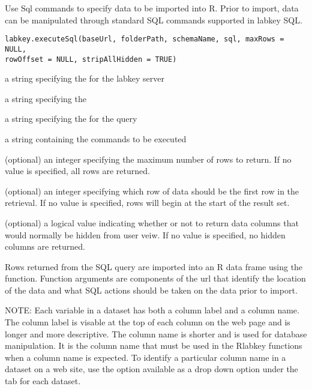 \begin{Description}\relax
Use Sql commands to specify data to be imported into R. Prior to import, data can
be manipulated through standard SQL commands supported in labkey SQL.
\end{Description}
\begin{Usage}
\begin{verbatim}
labkey.executeSql(baseUrl, folderPath, schemaName, sql, maxRows = NULL, 
rowOffset = NULL, stripAllHidden = TRUE)
\end{verbatim}
\end{Usage}
\begin{Arguments}
\begin{ldescription}
\item[\code{baseUrl}] a string specifying the for the labkey server
\item[\code{folderPath}] a string specifying the  
\item[\code{schemaName}] a string specifying the   for the query
\item[\code{sql}] a string containing the  commands to be executed
\item[\code{maxRows}] (optional) an integer specifying the maximum number of rows to return. If no value is specified, all rows are returned.
\item[\code{rowOffset}] (optional) an integer specifying which row of data should be the first row in the retrieval. 
If no value is specified, rows will begin at the start of the result set.
\item[\code{stripAllHidden}] (optional) a logical value indicating whether or not to return data columns that would 
normally be hidden from user veiw. If no value is specified, no hidden columns are returned.
\end{ldescription}
\end{Arguments}
\begin{Details}\relax
Rows returned from the SQL query are imported into an R data frame using the 
function. Function arguments are components of the url that identify the location of the
data and what SQL actions should be taken on the data prior to import.


NOTE: Each variable in a dataset has both a column label and a column name. The column label is visable at the top
of each column on the web page and is longer and more descriptive. The column name is shorter and is
used  for database manipulation. It is the column name that must be used in
the Rlabkey functions when a column name is expected. To identify a particular column name in a dataset on
a web site, use the  option available as a drop down option under the 
tab for each dataset.
\end{Details}
